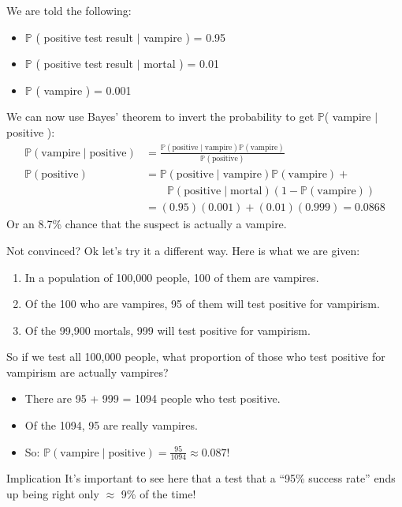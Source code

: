 \documentclass[dvipsnames,mathserif, handout]{beamer}
\begin{document}
{\begin{frame}
We are told the following:
	\begin{itemize}
		\item $\mathbb{P}$ ( positive test result $\mid$ vampire ) = 0.95
		\item $\mathbb{P}$ ( positive test result $\mid$ mortal ) = 0.01
		\item $\mathbb{P}$ ( vampire ) = 0.001
	\end{itemize}
	We can now use Bayes' theorem to invert the probability to get $\mathbb{P}$( vampire $\mid$ positive ):
	\begin{align*}
		\mathbb{P} ( \text{vampire} \mid \text{positive} ) 	&= \frac{ \mathbb{P} ( \text{positive} \mid \text{vampire} ) \mathbb{P} ( \text{vampire} ) }{ \mathbb{P} ( \text{positive} ) }	\\
		\mathbb{P} ( \text{positive} ) 					&= \mathbb{P} ( \text{positive} \mid \text{vampire} ) \mathbb{P} ( \text{vampire} ) + \\
								&\qquad \mathbb{P} ( \text{positive} \mid \text{mortal} ) \left( 1 - \mathbb{P} ( \text{vampire} ) \right) \\
												&= (0.95)(0.001) + (0.01)(0.999) = 0.0868
	\end{align*}
	Or an 8.7\% chance that the suspect is actually a vampire.
\end{frame}

\begin{frame}
Not convinced? Ok let's try it a different way. Here is what we are given:
	\begin{enumerate}
		\item In a population of 100,000 people, 100 of them are vampires.
		\item Of the 100 who are vampires, 95 of them will test positive for vampirism.
		\item Of the 99,900 mortals, 999 will test positive for vampirism.
	\end{enumerate}
	So if we test all 100,000 people, what proportion of those who test positive for vampirism are actually vampires? 
	\begin{itemize}
		\item There are 95 + 999 = 1094 people who test positive. 
		\item Of the 1094, 95 are really vampires. 
		\item So: $\mathbb{P} ( \text{vampire} \mid \text{positive} ) = \frac{95}{1094} \approx 0.087$!
	\end{itemize}
	\begin{block}{Implication}
		It's important to see here that a test that a ``95\% success rate'' ends up being right only $\approx$ 9\% of the time!
	\end{block}
\end{frame}

}
\end{document}
